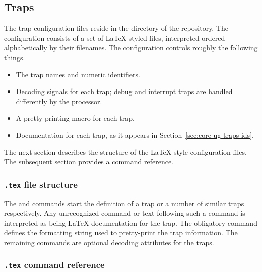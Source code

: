 
\subsection{Traps}
\label{sec:core-ug-cfg-traps}

The trap configuration files reside in the  directory of the 
\rvex{} repository. The configuration consists of a set of LaTeX-styled files, 
interpreted ordered alphabetically by their filenames. The configuration 
controls roughly the following things.

\begin{itemize}

\item The trap names and numeric identifiers.

\item Decoding signals for each trap; debug and interrupt traps are handled
      differently by the processor.
      
\item A pretty-printing macro for each trap.
      
\item Documentation for each trap, as it appears in
      Section~\ref{sec:core-ug-traps-ids}.

\end{itemize}

\noindent The next section describes the structure of the LaTeX-style
configuration files. The subsequent section provides a command reference.


\subsubsection[.tex file structure]{\texttt{.tex} file structure}
\label{sec:core-ug-cfg-traps-struct}

The \code{\trap} and \code{\trapgen} commands start the definition of a trap or
a number of similar traps respectively. Any unrecognized command or text
following such a command is interpreted as being LaTeX documentation for the
trap. The obligatory \code{\description} command defines the formatting string
used to pretty-print the trap information. The remaining commands are optional
decoding attributes for the traps.


\subsubsection[.tex command reference]{\texttt{.tex} command reference}
\label{sec:core-ug-cfg-traps-cref}

